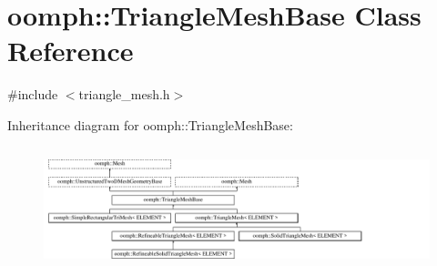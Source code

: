 \hypertarget{classoomph_1_1TriangleMeshBase}{}\section{oomph\+:\+:Triangle\+Mesh\+Base Class Reference}
\label{classoomph_1_1TriangleMeshBase}


{\ttfamily \#include $<$triangle\+\_\+mesh.\+h$>$}

Inheritance diagram for oomph\+:\+:Triangle\+Mesh\+Base\+:\begin{figure}[H]
\begin{center}
\leavevmode
\includegraphics[height=3.612903cm]{classoomph_1_1TriangleMeshBase}
\end{center}
\end{figure}

